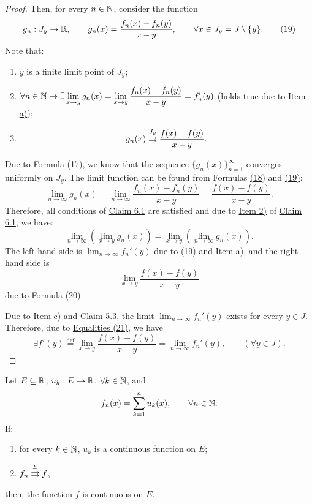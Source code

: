 \begin{proof}
Then, for every $n\in\mathbb{N}$, consider the function
\[
g_n:J_y\to\mathbb{R},
\qquad
g_n(x)=\frac{f_n(x)-f_n(y)}{x-y},
\qquad \forall x\in J_y=J\setminus\{y\}.
\tag{19}\label{eq:6:19:1}
\]
Note that:
\begin{enumerate}[label=\alph*)]
    \item $y$ is a finite limit point of $J_y$;
    \item $\forall n\in\mathbb{N}\to \exists\displaystyle\lim_{x\to y}g_n(x)
    =\displaystyle\lim_{x\to y}\frac{f_n(x)-f_n(y)}{x-y}=f_n'(y)$ (holds true due to \hyperref[item:claim:6.10:a]{Item a)});
    \item
    \[
    g_n(x)\mathrel{\overset{J_y}{\rightrightarrows}}\frac{f(x)-f(y)}{x-y}.
    \]
\end{enumerate}
Due to \hyperref[eq:6:17:1]{Formula (17)}, we know that the sequence $\{g_n(x)\}_{n=1}^{\infty}$ converges uniformly on $J_y$. The limit function can be found from Formulas \hyperref[eq:6:18:1]{(18)} and \hyperref[eq:6:19:1]{(19)}:
\[
\lim_{n\to\infty}g_n(x)
=\lim_{n\to\infty}\frac{f_n(x)-f_n(y)}{x-y}
=\frac{f(x)-f(y)}{x-y}.
\tag{20}\label{eq:6:20:1}
\]
Therefore, all conditions of \hyperref[claim:6.1]{Claim 6.1} are satisfied and due to \hyperref[item:claim:6.1:2]{Item 2)} of \hyperref[claim:6.1]{Claim 6.1}, we have:
\[
\lim_{n\to\infty}\left(\lim_{x\to y}g_n(x)\right)
=
\lim_{x\to y}\left(\lim_{n\to\infty}g_n(x)\right).
\tag{21}\label{eq:6:21:1}
\]
The left hand side is $\lim_{n\to\infty}f_n'(y)$ due to \hyperref[eq:6:19:1]{(19)} and \hyperref[item:claim:6.10:a]{Item a)}, and the right hand side is
\[
\lim_{x\to y}\frac{f(x)-f(y)}{x-y}
\]
due to \hyperref[eq:6:20:1]{Formula (20)}.

Due to \hyperref[item:claim:6.10:c]{Item c)} and \hyperref[claim:5.3]{Claim 5.3}, the limit $\lim_{n\to\infty}f_n'(y)$ exists for every $y\in J$. Therefore, due to \hyperref[eq:6:21:1]{Equalities (21)}, we have
\[
\exists f'(y)\overset{\mathrm{def}}{=}\lim_{x\to y}\frac{f(x)-f(y)}{x-y}
=\lim_{n\to\infty}f_n'(y),
\qquad (\forall y\in J).
\]
\end{proof}

\begin{claim}\label{claim:6.11}
Let $E\subseteq\mathbb{R}$, $u_k:E\to\mathbb{R}$, $\forall k\in\mathbb{N}$, and
\[
f_n(x)=\sum_{k=1}^{n}u_k(x),\qquad \forall n\in\mathbb{N}.
\]
If:
\begin{enumerate}[label=\alph*)]
    \item\label{item:claim:6.11:a} for every $k\in\mathbb{N}$, $u_k$ is a continuous function on $E$;
    \item\label{item:claim:6.11:b} $f_n\mathrel{\overset{E}{\rightrightarrows}}f$,
\end{enumerate}
then, the function $f$ is continuous on $E$.
\end{claim}

